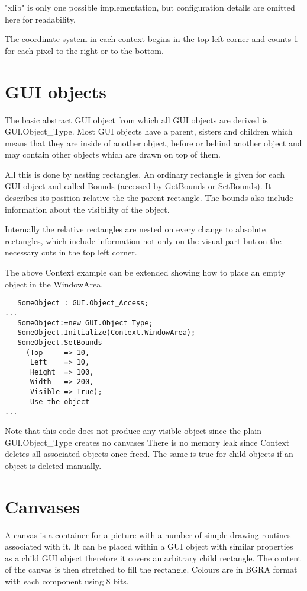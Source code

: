 \documentclass{article}
\begin{document}
"xlib" is only one possible implementation, but configuration details are omitted here for readability.

The coordinate system in each context begins in the top left corner and counts 1 for each pixel
to the right or to the bottom.

\section{GUI objects}
The basic abstract GUI object from which all GUI objects are derived is GUI.Object\_Type.
Most GUI objects have a parent, sisters and children which means that they are inside
of another object, before or behind another object and may contain other objects which
are drawn on top of them.

All this is done by nesting rectangles. An ordinary rectangle is given for each GUI object
and called Bounds (accessed by GetBounds or SetBounds). It describes its position relative
the the parent rectangle. The bounds also include information about the visibility of the
object.

Internally the relative rectangles are nested on every change to absolute rectangles,
which include information not only on the visual part but on the necessary cuts in the
top left corner.

The above Context example can be extended showing how to place an empty object in the WindowArea.
\begin{lstlisting}
   SomeObject : GUI.Object_Access;
...
   SomeObject:=new GUI.Object_Type;
   SomeObject.Initialize(Context.WindowArea);
   SomeObject.SetBounds
     (Top     => 10,
      Left    => 10,
      Height  => 100,
      Width   => 200,
      Visible => True);
   -- Use the object
...
\end{lstlisting}
Note that this code does not produce any visible object since the plain GUI.Object\_Type creates no
canvases
There is no memory leak since Context deletes all associated objects once freed.
The same is true for child objects if an object is deleted manually.

\section{Canvases}

A canvas is a container for a picture with a number of simple drawing routines associated with it.
It can be placed within a GUI object with similar properties as a child GUI object therefore
it covers an arbitrary child rectangle.
The content of the canvas is then stretched to fill the rectangle.
Colours are in BGRA format with each component using 8 bits.
\end{document}
